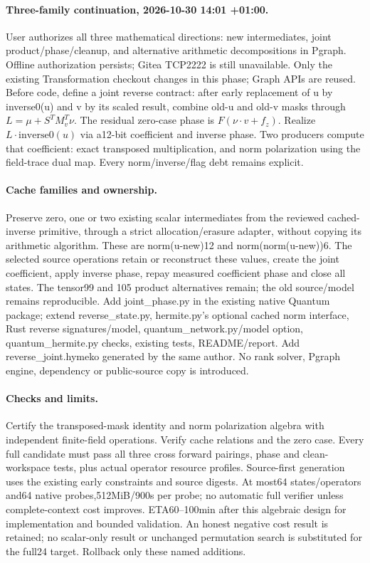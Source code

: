 \documentclass{article}
\begin{document}
\paragraph{Three-family continuation, 2026-10-30 14:01 +01:00.}
User authorizes all three mathematical directions: new intermediates, joint
product/phase/cleanup, and alternative arithmetic decompositions in Pgraph.
Offline authorization persists; Gitea TCP2222 is still unavailable. Only the
existing Transformation checkout changes in this phase; Graph APIs are reused.
Before code, define a joint reverse contract: after early replacement of u by
inverse0(u) and v by its scaled result, combine old-u and old-v masks through
$L=\mu+S^T M_v^T\nu$. The residual zero-case phase is
$F(\nu\cdot v+f_z)$. Realize $L\cdot\mathrm{inverse0}(u)$ via a12-bit
coefficient and inverse phase. Two producers compute that coefficient: exact
transposed multiplication, and norm polarization using the field-trace dual
map. Every norm/inverse/flag debt remains explicit.
\paragraph{Cache families and ownership.} Preserve zero, one or two existing
scalar intermediates from the reviewed cached-inverse primitive, through a
strict allocation/erasure adapter, without copying its arithmetic algorithm.
These are norm(u-new)12 and norm(norm(u-new))6. The selected source operations
retain or reconstruct these values, create the joint coefficient, apply inverse
phase, repay measured coefficient phase and close all states. The tensor99 and
105 product alternatives remain; the old source/model remains reproducible.
Add joint\_phase.py in the existing native Quantum package; extend reverse\_state.py,
hermite.py's optional cached norm interface, Rust reverse signatures/model,
quantum\_network.py/model option, quantum\_hermite.py checks, existing tests,
README/report. Add reverse\_joint.hymeko generated by the same author. No rank
solver, Pgraph engine, dependency or public-source copy is introduced.
\paragraph{Checks and limits.} Certify the transposed-mask identity and norm
polarization algebra with independent finite-field operations. Verify cache
relations and the zero case. Every full candidate must pass all three cross
forward pairings, phase and clean-workspace tests, plus actual operator resource
profiles. Source-first generation uses the existing early constraints and source
digests. At most64 states/operators and64 native probes,512MiB/900s per probe;
no automatic full verifier unless complete-context cost improves. ETA60--100min
after this algebraic design for implementation and bounded validation. An honest
negative cost result is retained; no scalar-only result or unchanged permutation
search is substituted for the full24 target. Rollback only these named additions.
\end{document}
